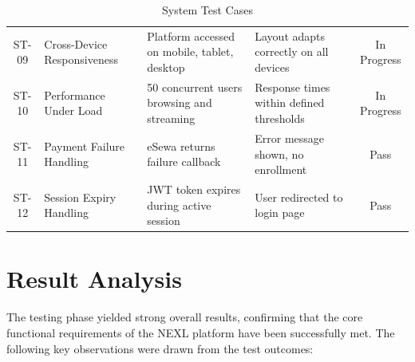 \begin{table}[H]
\begin{tabular}{|c|p{3.5cm}|p{3.5cm}|p{2.5cm}|c|}
ST-09 & Cross-Device Responsiveness          & Platform accessed on mobile, tablet, desktop                                      & Layout adapts correctly on all devices   & In Progress \\
ST-10 & Performance Under Load               & 50 concurrent users browsing and streaming                                        & Response times within defined thresholds & In Progress \\
ST-11 & Payment Failure Handling             & eSewa returns failure callback                                                    & Error message shown, no enrollment       & Pass \\
ST-12 & Session Expiry Handling              & JWT token expires during active session                                           & User redirected to login page            & Pass \\
\hline
\end{tabular}
\caption{System Test Cases}
\label{tab:system-tests}
\end{table}

\section{Result Analysis}

The testing phase yielded strong overall results, confirming that the core functional requirements of the NEXL platform have been successfully met. The following key observations were drawn from the test outcomes:

